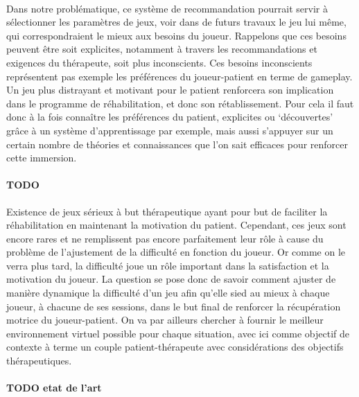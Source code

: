  \paragraph{}
 Dans notre problématique, ce système de recommandation pourrait servir à sélectionner les paramètres de jeux, voir dans de futurs travaux le jeu lui même, qui correspondraient le mieux aux besoins du joueur. Rappelons que ces besoins peuvent être soit explicites, notamment à travers les recommandations et exigences du thérapeute, soit plus inconscients. Ces besoins inconscients représentent pas exemple les préférences du joueur-patient en terme de gameplay. Un jeu plus distrayant et motivant pour le patient renforcera son implication dans le programme de réhabilitation, et donc son rétablissement. Pour cela il faut donc à la fois connaître les préférences du patient, explicites ou `découvertes'  grâce à un système d'apprentissage par exemple, mais aussi s'appuyer sur un certain nombre de théories et connaissances que l'on sait efficaces pour renforcer cette immersion. 		
 
 


			\paragraph{TODO}
Existence de jeux sérieux à but thérapeutique ayant pour but de faciliter la réhabilitation en maintenant la motivation du patient. Cependant, ces jeux sont encore rares et ne remplissent pas encore parfaitement leur rôle à cause du problème de l'ajustement de la difficulté en fonction du joueur.
Or comme on le verra plus tard, la difficulté joue un rôle important dans la satisfaction et la motivation du joueur. La question se pose donc de savoir comment ajuster de manière dynamique la difficulté d'un jeu afin qu'elle sied au mieux à chaque joueur, à chacune de ses sessions, dans le but final de renforcer la récupération motrice du joueur-patient. On va par ailleurs chercher à fournir le meilleur environnement virtuel possible pour chaque situation, avec ici comme objectif de contexte à terme un couple patient-thérapeute avec considérations des objectifs thérapeutiques. 
			\paragraph{TODO etat de l'art}	